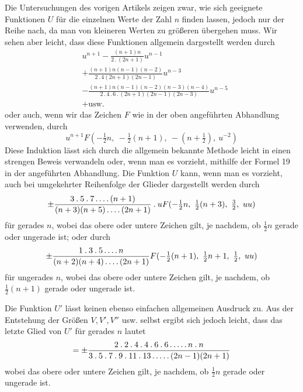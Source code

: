 Die Untersuchungen des vorigen Artikels zeigen zwar, wie sich geeignete Funktionen $U$ für die einzelnen Werte der Zahl $n$ finden lassen, jedoch nur der Reihe nach, da man von kleineren Werten zu größeren übergehen muss. Wir sehen aber leicht, dass diese Funktionen allgemein dargestellt werden durch
\[
\begin{aligned}&
u^{n+1}-\frac{(n+1)n}{2\mathbin{.}(2n+1)}u^{n-1}
\\[5pt]&+\frac{(n+1)n(n-1)(n-2)}{2\mathbin{.}4(2n+1)(2n-1)}u^{n-3}
\\[5pt]&-\frac{(n+1)n(n-1)(n-2)(n-3)(n-4)}{2\mathbin{.}4\mathbin{.}6\mathbin{.}(2n+1)(2n-1)(2n-3)}u^{n-5}\\ &
+\text{usw.}
\end{aligned}
\]
oder auch, wenn wir das Zeichen $F$ wie in der oben angeführten Abhandlung verwenden, durch
\[
u^{n+1}F(-\tfrac12n,\ -\tfrac12(n+1),\ -(n+\tfrac12),\ u^{-2})
\]
Diese Induktion lässt sich durch die allgemein bekannte Methode leicht in einen strengen Beweis verwandeln oder, wenn man es vorzieht, mithilfe der Formel 19 in der angeführten Abhandlung. Die Funktion $U$ kann, wenn man es vorzieht, auch bei umgekehrter Reihenfolge der Glieder dargestellt werden durch
\[
\pm\frac{3\mathbin{.}5\mathbin{.}7\mathinner{.\,.\,.\,.}(n+1)}{(n+3)(n+5)\mathinner{.\,.\,.\,.}(2n+1)}\mathbin{.}uF(-\tfrac12n,\ \tfrac12(n+3),\ \tfrac32,\ uu)
\]
für gerades $n$, wobei das obere oder untere Zeichen gilt, je nachdem, ob $\frac12n$ gerade oder ungerade ist; oder durch
\[
\pm\frac{1\mathbin{.}3\mathbin{.}5\mathinner{.\,.\,.\,.} n}{(n+2)(n+4)\mathinner{.\,.\,.\,.}(2n+1)}F(-\tfrac12(n+1),\ \tfrac12n+1,\ \tfrac12,\ uu)
\]
für ungerades $n$, wobei das obere oder untere Zeichen gilt, je nachdem, ob $\frac12(n+1)$ gerade oder ungerade ist.

Die Funktion $U'$ lässt keinen ebenso einfachen allgemeinen Ausdruck zu. Aus der Entstehung der Größen $V,V',V''$ usw. selbst ergibt sich jedoch leicht, dass das letzte Glied von $U'$ für gerades $n$ lautet
\[
=\pm\frac{2\mathbin{.}2\mathbin{.}4\mathbin{.}4\mathbin{.}6\mathbin{.}6\mathinner{.\,.\,.\,.\,.} n\mathbin{.}n}{3\mathbin{.}5\mathbin{.}7\mathbin{.}9\mathbin{.}11\mathbin{.}13\mathinner{.\,.\,.\,.\,.}(2n-1)(2n+1)}
\]
wobei das obere oder untere Zeichen gilt, je nachdem, ob $\frac12n$ gerade oder ungerade ist.


